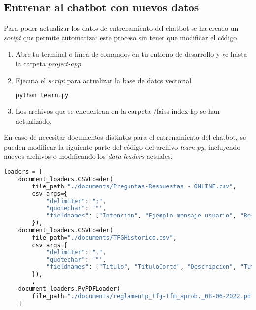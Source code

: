 \subsection{Entrenar al chatbot con nuevos datos}

Para poder actualizar los datos de entrenamiento del chatbot se ha creado un \textit{script} que permite automatizar este proceso sin tener que modificar el código.

\begin{enumerate}
\item Abre tu terminal o línea de comandos en tu entorno de desarrollo y ve hasta la carpeta \textit{project-app}.

\item Ejecuta el \textit{script} para actualizar la base de datos vectorial.

\begin{lstlisting}[language=Python, caption=Ejecutar \textit{script} para la creación de la base de datos vectorial.]
    python learn.py
\end{lstlisting}

\item Los archivos que se encuentran en la carpeta /faiss-index-hp se han actualizado.

\end{enumerate}

En caso de necesitar documentos distintos para el entrenamiento del chatbot, se pueden modificar la siguiente parte del código del archivo \textit{learn.py}, incluyendo nuevos archivos o modificando los \textit{data loaders} actuales.

\begin{lstlisting}[language=Python, caption=Data loaders para la creación de la base de datos vectorial.]
   loaders = [
    document_loaders.CSVLoader(
        file_path="./documents/Preguntas-Respuestas - ONLINE.csv",
        csv_args={
            "delimiter": ";",
            "quotechar": '"',
            "fieldnames": ["Intencion", "Ejemplo mensaje usuario", "Respuesta"],
        }),
    document_loaders.CSVLoader(
        file_path="./documents/TFGHistorico.csv",
        csv_args={
            "delimiter": ",",
            "quotechar": '"',
            "fieldnames": ["Titulo", "TituloCorto", "Descripcion", "Tutor1", "Tutor2", "Tutor3"],
        }),
        ,
    document_loaders.PyPDFLoader(
        file_path="./documents/reglamentp_tfg-tfm_aprob._08-06-2022.pdf")
    ]
\end{lstlisting}

